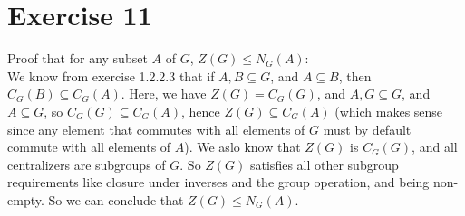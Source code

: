 \documentclass{article}
\begin{document}
    \section*{Exercise 11}
    Proof that for any subset $A$ of $G$, $Z(G) \leqslant N_G(A)$: \\
    We know from exercise 1.2.2.3 that if $A, B \subseteq G$,
    and $A \subseteq B$, then $C_G(B) \subseteq C_G(A)$.
    Here, we have $Z(G) = C_G(G)$,
    and $A, G \subseteq G$,
    and $A \subseteq G$, 
    so $C_G(G) \subseteq C_G(A)$,
    hence $Z(G) \subseteq C_G(A)$
    (which makes sense since any element that commutes with all elements of
    $G$ must by default commute with all elements of $A$). 
    We aslo know that $Z(G)$ is $C_G(G)$, and all centralizers
    are subgroups of $G$.
    So $Z(G)$ satisfies all other subgroup requirements
    like closure under inverses and the group operation, 
    and being non-empty.
    So we can conclude that $Z(G) \leqslant N_G(A)$.
\end{document}
